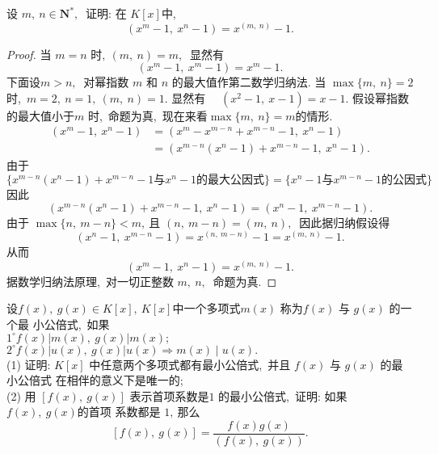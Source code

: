 \newpage
\begin{problem}
	设 $ m,\  n \in \mathbf{N}^{*} ,\ $ 证明: 在 $ K[x]  $中,\ 
	$$\left(x^{m}-1,\  x^{n}-1\right)=x^{(m,\  n)}-1 .$$
\end{problem}
\begin{proof}
	当  $m=n$  时$,\   (m,\  n)=m ,\ $ 显然有
	$$\left(x^{m}-1,\  x^{m}-1\right)=x^{m}-1 .$$
	下面设$  m>n ,\ $ 对幂指数 $ m$  和 $ n $ 的最大值作第二数学归纳法.
	当  $\max \{m,\  n\}=2  $时,\ $  m=2,\  n=1,\ (m,\  n)=1  .$
	显然有  $\quad\left(x^{2}-1,\  x-1\right)=x-1 .$
	假设幂指数的最大值小于$  m$  时,\  命题为真,\  现在来看$  \max \{m,\  n\}=m  $的情形.
	$$\begin{aligned}
		\left(x^{m}-1,\  x^{n}-1\right) & =\left(x^{m}-x^{m-n}+x^{m-n}-1,\  x^{n}-1\right) \\
		& =\left(x^{m-n}\left(x^{n}-1\right)+x^{m-n}-1,\  x^{n}-1\right) .
	\end{aligned}$$
	由于 $$\{x^{m-n}(x^n-1)+x^{m-n}-1\text{与}x^n-1\text{的最大公因式}\}=\{x^n-1\text{与}x^{m-n}-1\text{的公因式}\}$$
	因此  
	$$\left(x^{m-n}\left(x^{n}-1\right)+x^{m-n}-1,\  x^{n}-1\right)=\left(x^{n}-1,\  x^{m-n}-1\right) .$$
	由于 $ \max \{n,\  m-n\}<m ,\  $且 $ (n,\  m-n)=(m,\  n) ,\ $ 因此据归纳假设得
	$$\left(x^{n}-1,\  x^{m-n}-1\right)=x^{(n,\  m-n)}-1=x^{(m,\  n)}-1 .$$
	从而
	$$\left(x^{m}-1,\  x^{n}-1\right)=x^{(m,\  n)}-1 .$$
	据数学归纳法原理,\  对一切正整数 $ m,\  n ,\ $ 命题为真.
\end{proof}
\newpage
\begin{problem}
	设$  f(x),\  g(x) \in K[x],\  K[x]  $中一个多项式$  m(x) $ 称为$  f(x) $ 与  $g(x) $ 的一个最 小公倍式,\  如果\\
	$1^{\circ} f(x)|m(x),\  g(x)| m(x);$\\
	$2^{\circ} f(x)|u(x),\  g(x)| u(x) \Longrightarrow m(x) \mid u(x)  .$\\
	(1) 证明:  $K[x]$  中任意两个多项式都有最小公倍式,\  并且 $ f(x) $ 与 $ g(x) $ 的最小公倍式 在相伴的意义下是唯一的;\\
	(2) 用 $ [f(x),\  g(x)]$  表示首项系数是$ 1$ 的最小公倍式,\  证明: 如果  $f(x),\  g(x)  $的首项 系数都是 $1 ,\  $那么
	$$[f(x),\  g(x)]=\frac{f(x) g(x)}{(f(x),\  g(x))} .$$
\end{problem}

